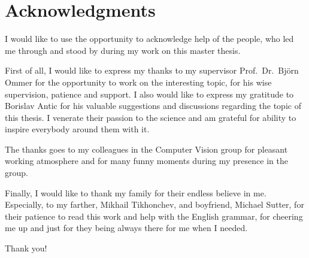 
\chapter*{Acknowledgments}
\thispagestyle{empty}
I would like to use the opportunity to acknowledge help of the people, who led me through and stood by during my work on this master thesis.

First of all, I would like to express my thanks to my supervisor Prof.~Dr.~Bj\"{o}rn Ommer for the opportunity to work on the interesting topic, for his wise supervision, patience and support. I also would like to express my gratitude to Borislav Antic for his valuable suggestions and discussions regarding the topic of this thesis. I venerate their passion to the science and am grateful for ability to inspire everybody around them with it.

The thanks goes to my colleagues in the Computer Vision group for pleasant working atmosphere and for many funny moments during my presence in the group.

Finally, I would like to thank my family for their endless believe in me. Especially, to my farther, Mikhail Tikhonchev, and boyfriend, Michael Sutter, for their patience to read this work and help with the English grammar, for cheering me up and just for they being always there for me when I needed.

Thank you!